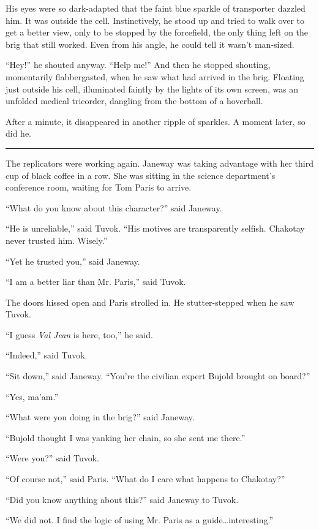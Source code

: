 \documentclass[twoside,letterpaper,12pt]{memoir}
\begin{document}
His eyes were so dark-adapted that the faint blue sparkle of transporter dazzled him. It was outside the cell. Instinctively, he stood up and tried to walk over to get a better view, only to be stopped by the forcefield, the only thing left on the brig that still worked. Even from his angle, he could tell it wasn't man-sized.

``Hey!'' he shouted anyway. ``Help me!'' And then he stopped shouting, momentarily flabbergasted, when he saw what had arrived in the brig. Floating just outside his cell, illuminated faintly by the lights of its own screen, was an unfolded medical tricorder, dangling from the bottom of a hoverball.

After a minute, it disappeared in another ripple of sparkles. A moment later, so did he.

\fancybreak{\rule{3cm}{0.4 pt}}
The replicators were working again. Janeway was taking advantage with her third cup of black coffee in a row. She was sitting in the science department's conference room, waiting for Tom Paris to arrive.

``What do you know about this character?'' said Janeway.

``He is unreliable,'' said Tuvok. ``His motives are transparently selfish. Chakotay never trusted him. Wisely.''

``Yet he trusted you,'' said Janeway.

``I am a better liar than Mr. Paris,'' said Tuvok.

The doors hissed open and Paris strolled in. He stutter-stepped when he saw Tuvok.

``I guess \textit{Val Jean} is here, too,'' he said.

``Indeed,'' said Tuvok.

``Sit down,'' said Janeway. ``You're the civilian expert Bujold brought on board?''

``Yes, ma'am.''

``What were you doing in the brig?'' said Janeway.

``Bujold thought I was yanking her chain, so she sent me there.''

``Were you?'' said Tuvok.

``Of course not,'' said Paris. ``What do I care what happens to Chakotay?''

``Did you know anything about this?'' said Janeway to Tuvok.

``We did not. I find the logic of using Mr. Paris as a guide\ldots interesting.''
\end{document}
